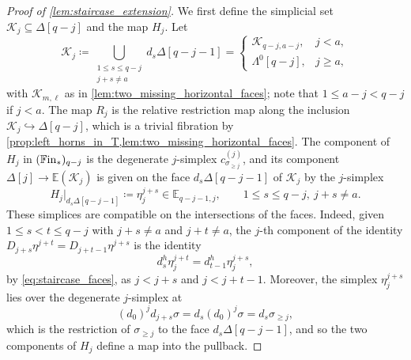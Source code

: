 \documentclass[10pt,reqno]{amsart}
\begin{document}
\begin{proof}[Proof of \cref{lem:staircase_extension}]
We first define the simplicial set $\mathcal K_j\subseteq\Delta[q-j]$
and the map $H_j$. Let
\begin{equation}\label{eq:Kj-cases}
  \mathcal K_j\coloneqq
  \bigcup_{\substack{1\le s\le q-j\\ j+s\ne a}}d_s\Delta[{q-j-1}]
  =
  \begin{cases}
    \mathcal K_{q-j,a-j}, & j<a,\\[1mm]
    \Lambda^0[{q-j}], & j\geq a,
  \end{cases}
\end{equation}
with $\mathcal K_{m,\ell}$ as in
\cref{lem:two_missing_horizontal_faces}; note that
$1\leq a-j<q-j$ if $j<a$. The map $R_j$ is the relative
restriction map along the inclusion
$\mathcal K_j\hookrightarrow\Delta[q-j]$, which is a trivial
fibration by
\cref{prop:left_horns_in_T,lem:two_missing_horizontal_faces}. The
component of $H_j$ in $(\mathbb{F}\mathrm{in}_*)_{q-j}$ is the degenerate
$j$-simplex $c_{\sigma_{\geq j}}^{(j)}$, and its component
$\Delta[j]\to\mathbb E(\mathcal K_j)$ is given on the face
$d_s\Delta[q-j-1]$ of $\mathcal K_j$ by the $j$-simplex
\begin{equation}\label{eq:Hj-face-definition}
  H_j|_{d_s\Delta[q-j-1]}\coloneqq\eta^{j+s}_j\in\mathbb E_{q-j-1,j},
  \qquad 1\le s\le q-j,\ j+s\ne a.
\end{equation}
These simplices are compatible on the intersections of the faces.
Indeed, given $1\le s<t\le q-j$ with $j+s\ne a$ and
$j+t\ne a$, the $j$-th component of the identity
$D_{j+s}\eta^{j+t}=D_{j+t-1}\eta^{j+s}$ is the identity
\[
  d_s^h\eta^{j+t}_j=d_{t-1}^h\eta^{j+s}_j,
\]
by \eqref{eq:staircase_faces}, as $j<j+s$ and $j<j+t-1$. Moreover,
the simplex $\eta^{j+s}_j$ lies over the degenerate $j$-simplex at
\[
 (d_0)^j d_{j+s}\sigma=d_s(d_0)^j\sigma
 =d_s\sigma_{\geq j},
\]
which is the restriction of $\sigma_{\geq j}$ to the face
$d_s\Delta[q-j-1]$, and so the two components of $H_j$ define a
map into the pullback.


\end{proof}
\end{document}
